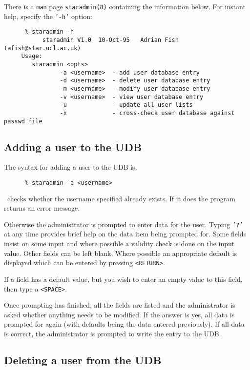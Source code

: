 There is a {\tt man} page {\tt staradmin(8)} containing the information below.
For instant help, specify the {\tt '-h'} option:

\begin{verbatim}
      % staradmin -h
           staradmin V1.0  10-Oct-95   Adrian Fish (afish@star.ucl.ac.uk)
     Usage:
        staradmin <opts>
                -a <username>  - add user database entry
                -d <username>  - delete user database entry
                -m <username>  - modify user database entry
                -v <username>  - view user database entry
                -u             - update all user lists
                -x             - cross-check user database against passwd file
\end{verbatim}

\subsection{Adding a user to the UDB}
\label{addinguser}

The syntax for adding a user to the UDB is:

\begin{verbatim}
      % staradmin -a <username>
\end{verbatim}

\staradmin\ checks whether the username specified already exists. If it does
the program returns an error message.

Otherwise the administrator is prompted to  enter data for the user. Typing
{\tt '?'} at any time provides brief help on the data item being prompted for.
Some fields insist on some input and where possible a validity check is done on
the input value. Other fields can be left blank. Where possible an appropriate
default is displayed which can be entered by pressing {\tt <RETURN>}.

If a field has a default value, but you wish to enter an empty value to this
field, then type a {\tt <SPACE>}.

Once prompting has finished, all the fields are listed and the
administrator is asked whether anything needs to be modified. If the
answer is yes, all data is prompted for again (with defaults being the data
entered previously). If all data is correct, the administrator is prompted
to write the entry to the UDB.

\subsection{Deleting a user from the UDB}

